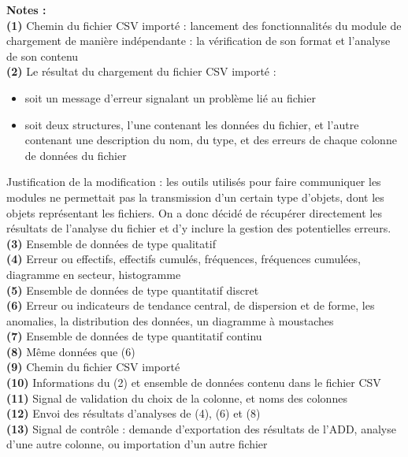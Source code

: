 		\textbf{Notes :}\\
			\textbf{({\color{red}1})} Chemin du fichier CSV importé : lancement des fonctionnalités du module de chargement de manière indépendante : la vérification de son format et l'analyse de son contenu\\
			\textbf{({\color{red}2})} Le résultat du chargement du fichier CSV importé :
			\begin{itemize}
				\item soit un message d'erreur signalant un problème lié au fichier
				\item soit deux structures, l'une contenant les données du fichier, et l'autre contenant une description du nom, du type, et des erreurs de chaque colonne de données du fichier
			\end{itemize}
			{\color{red}Justification de la modification :} les outils utilisés pour faire communiquer les modules ne permettait pas la transmission d'un certain type d'objets, dont les objets représentant les fichiers. On a donc décidé de récupérer directement les résultats de l'analyse du fichier et d'y inclure la gestion des potentielles erreurs.\\
			\textbf{(3)} Ensemble de données de type qualitatif\\
			\textbf{(4)} Erreur ou effectifs, effectifs cumulés, fréquences, fréquences cumulées, diagramme en secteur, histogramme\\
			\textbf{(5)} Ensemble de données de type quantitatif discret\\
			\textbf{(6)} Erreur ou indicateurs de tendance central, de dispersion et de forme, les anomalies, la distribution des données, un diagramme à moustaches\\
			\textbf{(7)} Ensemble de données de type quantitatif continu\\
			\textbf{(8)} Même données que (6)\\
			\textbf{(9)} Chemin du fichier CSV importé \\
			\textbf{(10)} Informations du (2) et ensemble de données contenu dans le fichier CSV \\
			\textbf{(11)} Signal de validation du choix de la colonne, et noms des colonnes\\
			\textbf{(12)} Envoi des résultats d'analyses de (4), (6) et (8)\\
			\textbf{(13)} Signal de contrôle : demande d'exportation des résultats de l'ADD, analyse d'une autre colonne, ou importation d'un autre fichier\\
		
